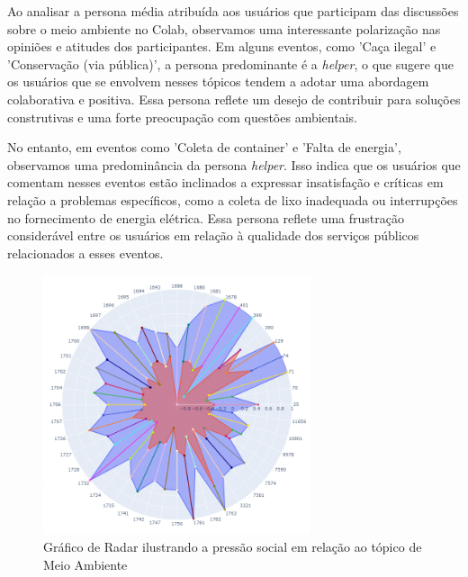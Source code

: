Ao analisar a persona média atribuída aos usuários que participam das discussões sobre o meio ambiente no Colab, observamos uma interessante polarização nas opiniões e atitudes dos participantes. Em alguns eventos, como 'Caça ilegal' e 'Conservação (via pública)', a persona predominante é a \textit{helper}, o que sugere que os usuários que se envolvem nesses tópicos tendem a adotar uma abordagem colaborativa e positiva. Essa persona reflete um desejo de contribuir para soluções construtivas e uma forte preocupação com questões ambientais.

No entanto, em eventos como 'Coleta de container' e 'Falta de energia', observamos uma predominância da persona \textit{helper}. Isso indica que os usuários que comentam nesses eventos estão inclinados a expressar insatisfação e críticas em relação a problemas específicos, como a coleta de lixo inadequada ou interrupções no fornecimento de energia elétrica. Essa persona reflete uma frustração considerável entre os usuários em relação à qualidade dos serviços públicos relacionados a esses eventos.

\begin{figure}[htb]
	\centering
	\includegraphics[width=0.7\textwidth]{images/social_barometer_environment.png}
	\caption{Gráfico de Radar ilustrando a pressão social em relação ao tópico de Meio Ambiente}
	\label{fig:social_barometer_environment}
\end{figure}

